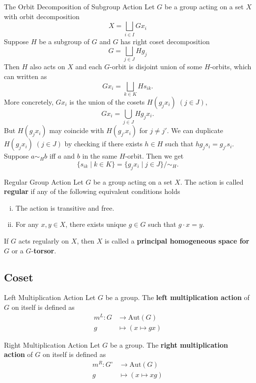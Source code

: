 \begin{example}{The Orbit Decomposition of Subgroup Action}{}
    Let $G$ be a group acting on a set $X$ with orbit decomposition
    \[
        X=\bigsqcup_{i \in I} G x_i
    \]
    Suppose $H$ be a subgroup of $G$ and $G$ has right coset decomposition
    \[
        G=\bigsqcup_{j \in J} Hg_j
    \]
    Then $H$ also acts on $X$ and each $G$-orbit is disjoint union of some $H$-orbits, which can written as
    \[
        Gx_i =\bigsqcup_{k \in K} H s_{ik}.
    \]
    More concretely, $Gx_i$ is the union of the cosets $H (g_jx_i)\;(j \in J)$,
    \[
        Gx_i =\bigcup_{j \in J} H g_j x_i.
    \]
    But $H (g_{j}x_i)$ may coincide with $H (g_{j'}x_i)$ for $j\ne j'$. We can duplicate $H (g_jx_i)\;(j \in J)$ by checking if there exists $h \in H$ such that $h g_j s_i=g_{j'} s_i$. Suppose $a \sim_H b$ iff $a$ and $b$ in the same $H$-orbit. Then we get
    \[
        \{s_{ik}\mid k \in K\}=\{g_j x_i \mid j \in J\}/\sim_H.
    \]
\end{example}

\begin{definition}{Regular Group Action}{}
    Let $G$ be a group acting on a set $X$. The action is called \textbf{regular} if any of the following equivalent conditions holds
    \begin{enumerate}[(i)]
        \item The action is transitive and free.
        \item For any $x,y\in X$, there exists unique $g\in G$ such that $g\cdot x=y$.
    \end{enumerate}
    If $G$ acts regularly on $X$, then $X$ is called a \textbf{principal homogeneous space for $G$} or a $G$-\textbf{torsor}.
\end{definition}

\subsection{Coset}
\begin{example}{Left Multiplication Action}{}
    Let $G$ be a group. The \textbf{left multiplication action} of $G$ on itself is defined as
    \begin{align*}
        m^L:G & \longrightarrow \mathrm{Aut}(G) \\
        g     & \longmapsto ( x\longmapsto gx)
    \end{align*}
\end{example}

\begin{example}{Right Multiplication Action}{}
    Let $G$ be a group. The \textbf{right multiplication action} of $G$ on itself is defined as
    \begin{align*}
        m^R:G^\circ & \longrightarrow \mathrm{Aut}(G) \\
        g           & \longmapsto ( x\longmapsto xg)
    \end{align*}
\end{example}

